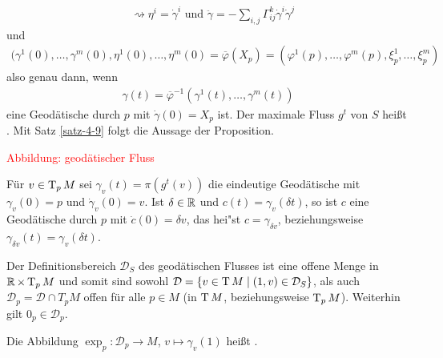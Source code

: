 \begin{bew}
\begin{enumerate}[label=(\Alph*),leftmargin=*,widest=B]
\begin{align*}
		& \rightsquigarrow \eta^i = \dot\gamma^i \text{ und } \ddot\gamma = -\sum_{i,j}\Gamma_{ij}^k\dot\gamma^i \dot\gamma^j
	\end{align*}
	und 
	\begin{align*}
		(\gamma^1(0), \ldots, \gamma^m(0), \eta^1(0), \ldots, \eta^m(0) = \overline\varphi(X_p) = (\varphi^1(p), \ldots, \varphi^m(p), \xi_p^1, \ldots, \xi_p^m)
	\end{align*}
	also genau dann, wenn
	\begin{align*}
		\gamma(t) = \overline\varphi^{-1}(\gamma^1(t), \ldots, \gamma^m(t))
	\end{align*}
	eine Geodätische durch $p$ mit $\dot \gamma(0) = X_p$ ist.	
	Der maximale Fluss $g^t$ von $S$ heißt .
	Mit Satz \ref{satz-4-9} folgt die Aussage der Proposition.
\end{enumerate}\end{bew}

\begin{center}
  \textcolor{red}{Abbildung: geodätischer Fluss}
\end{center}

Für $v \in \operatorname{T}_pM$ sei $\gamma_v(t) = \pi(g^t(v))$ die eindeutige Geodätische mit $\gamma_v(0) = p$ und $\dot \gamma_v(0) = v$.
Ist $\delta \in \operatorname{\mathbb{R}}$ und $c(t) = \gamma_v(\delta t)$, so ist $c$ eine Geodätische durch $p$ mit $\dot c(0) = \delta v$, das hei"st $c = \gamma_{\delta v}$, beziehungsweise $\gamma_{\delta v}(t) = \gamma_v(\delta t)$.

Der Definitionsbereich $\mathcal D_S$ des geodätischen Flusses ist eine offene Menge in $\operatorname{\mathbb{R}} \times \operatorname{T}_pM$ und somit sind sowohl $\mathcal D = \{v \in \operatorname{T} M \mid (1,v) \in \mathcal D_S\}$, als auch $\mathcal D_p = \mathcal D \cap T_pM$ offen für alle $p \in M$ (in $\operatorname{T} M$, beziehungsweise $\operatorname{T}_pM$). Weiterhin gilt $0_p \in \mathcal D_p$.

\begin{Dfn}
  Die Abbildung $\exp_p\colon\mathcal D_p \to M$, $v \mapsto \gamma_v(1)$ heißt .
\end{Dfn}

